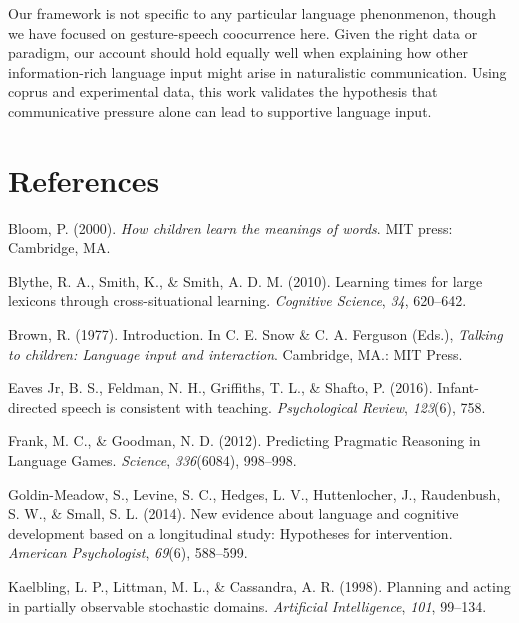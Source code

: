 \documentclass[10pt, letterpaper]{article}
\begin{document}
Our framework is not specific to any particular language phenonmenon,
though we have focused on gesture-speech coocurrence here. Given the
right data or paradigm, our account should hold equally well when
explaining how other information-rich language input might arise in
naturalistic communication. Using coprus and experimental data, this
work validates the hypothesis that communicative pressure alone can lead
to supportive language input.

\section{References}\label{references}

\setlength{\parindent}{-0.1in} \setlength{\leftskip}{0.125in}

\noindent

\hypertarget{refs}{}
\hypertarget{ref-bloom2000}{}
Bloom, P. (2000). \emph{How children learn the meanings of words}. MIT
press: Cambridge, MA.

\hypertarget{ref-blythe2010}{}
Blythe, R. A., Smith, K., \& Smith, A. D. M. (2010). Learning times for
large lexicons through cross-situational learning. \emph{Cognitive
Science}, \emph{34}, 620--642.

\hypertarget{ref-brown1977}{}
Brown, R. (1977). Introduction. In C. E. Snow \& C. A. Ferguson (Eds.),
\emph{Talking to children: Language input and interaction}. Cambridge,
MA.: MIT Press.

\hypertarget{ref-eaves-jr2016}{}
Eaves Jr, B. S., Feldman, N. H., Griffiths, T. L., \& Shafto, P. (2016).
Infant-directed speech is consistent with teaching. \emph{Psychological
Review}, \emph{123}(6), 758.

\hypertarget{ref-frank2012}{}
Frank, M. C., \& Goodman, N. D. (2012). Predicting Pragmatic Reasoning
in Language Games. \emph{Science}, \emph{336}(6084), 998--998.

\hypertarget{ref-goldin-meadow2014}{}
Goldin-Meadow, S., Levine, S. C., Hedges, L. V., Huttenlocher, J.,
Raudenbush, S. W., \& Small, S. L. (2014). New evidence about language
and cognitive development based on a longitudinal study: Hypotheses for
intervention. \emph{American Psychologist}, \emph{69}(6), 588--599.

\hypertarget{ref-kaelbling1998}{}
Kaelbling, L. P., Littman, M. L., \& Cassandra, A. R. (1998). Planning
and acting in partially observable stochastic domains. \emph{Artificial
Intelligence}, \emph{101}, 99--134.
\end{document}
